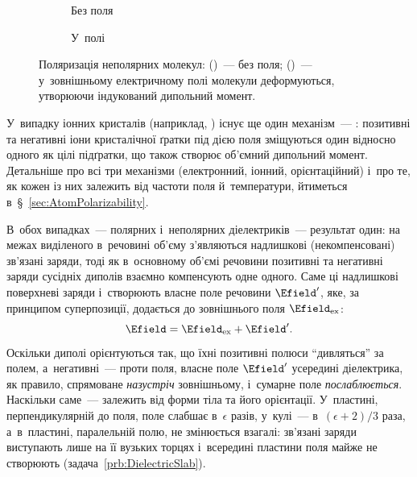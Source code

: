 \begin{itemize}
	      \begin{figure}[h!]
		      \centering
		      \begin{subfigure}[t]{0.48\linewidth}
			      \centering
			      \caption{Без поля}
			      \label{pic:NonPolarNoField}
		      \end{subfigure}\hfill
		      \begin{subfigure}[t]{0.48\linewidth}
			      \centering
			      \caption{У~полі}
			      \label{pic:NonPolarField}
		      \end{subfigure}
		      \caption{Поляризація неполярних молекул:
		      (\protect{})~--- без поля;
		      (\protect{})~--- у~зовнішньому електричному полі
		      молекули деформуються, утворюючи індукований дипольний момент.}
		      \label{pic:PolarizationNonPolar}
	      \end{figure}
\end{itemize}

У~випадку іонних кристалів (наприклад, ) існує ще один механізм~---
: позитивні та негативні іони кристалічної ґратки під дією поля
зміщуються один відносно одного як цілі підґратки, що також створює об'ємний дипольний
момент. Детальніше про всі три механізми (електронний, іонний, орієнтаційний) і~про те, як
кожен із них залежить від частоти поля й~температури, йтиметься
в~\S~\ref{sec:AtomPolarizability}.

В~обох випадках~--- полярних і~неполярних діелектриків~--- результат один: на межах
виділеного в~речовині об'єму з'являються надлишкові (некомпенсовані) зв'язані заряди, тоді
як в~основному об'ємі речовини позитивні та негативні заряди сусідніх диполів взаємно
компенсують одне одного. Саме ці надлишкові поверхневі заряди і~створюють власне поле
речовини $\Efield'$, яке, за принципом суперпозиції, додається до зовнішнього поля
$\Efield_\text{ex}$:
\begin{equation*}
	\Efield = \Efield_\text{ex} + \Efield'.
\end{equation*}
Оскільки диполі орієнтуються так, що їхні позитивні полюси \enquote{дивляться} за полем,
а~негативні~--- проти поля, власне поле $\Efield'$ усередині діелектрика, як правило,
спрямоване \emph{назустріч} зовнішньому, і~сумарне поле \emph{послаблюється}. Наскільки
саме~--- залежить від форми тіла та його орієнтації. У~пластині, перпендикулярній до поля,
поле слабшає в~$\epsilon$ разів, у~кулі~--- в~$(\epsilon+2)/3$ раза, а~в~пластині,
паралельній полю, не змінюється взагалі: зв'язані заряди виступають лише на її вузьких
торцях і~всередині пластини поля майже не створюють (задача~\ref{prb:DielectricSlab}).

